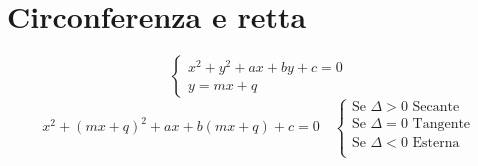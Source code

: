 \chapter{Circonferenza e retta}
\begin{equation}
\begin{cases}
x^2+y^2+ax+by+c=0\\
y=mx+q
\end{cases}
\end{equation}
\begin{equation}
x^2+(mx+q)^2+ax+b(mx+q)+c=0\quad\begin{cases}
\text{Se $\Delta >0$ Secante}\\
\text{Se $\Delta =0$ Tangente}\\
\text{Se $\Delta <0$ Esterna}\\
\end{cases}
\end{equation}

